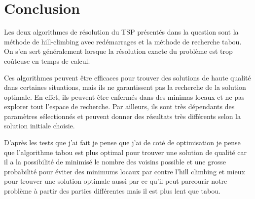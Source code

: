 \documentclass[12pt]{article}
\begin{document}
        \section{Conclusion}
        Les deux algorithmes de résolution du TSP présentés dans la question sont la méthode de hill-climbing avec redémarrages et la méthode de recherche tabou. On s'en sert généralement lorsque la résolution exacte du problème est trop coûteuse en temps de calcul.

        Ces algorithmes peuvent être efficaces pour trouver des solutions de haute qualité dans certaines situations, mais ils ne garantissent pas la recherche de la solution optimale. En effet, ils peuvent être enfermés dans des minimas locaux et ne pas explorer tout l'espace de recherche. Par ailleurs, ils sont très dépendants des paramètres sélectionnés et peuvent donner des résultats très différents selon la solution initiale choisie.

        D'après les tests que j'ai fait je pense que j'ai de coté de optimisation je pense que l'algorithme tabou est plus optimal pour trouver une solution de qualité car il a la possibilité de minimisé le nombre des voisins possible et une grosse probabilité pour éviter des minimums locaux par contre l'hill climbing et mieux pour trouver une solution optimale aussi par ce qu'il peut parcourir notre problème à partir des parties différentes mais il est plus lent que tabou.
\end{document}
